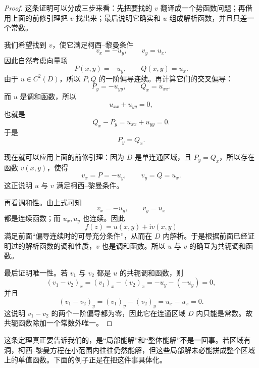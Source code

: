 \begin{proof}
这条证明可以分成三步来看：先把要找的 $v$ 翻译成一个势函数问题；再借用上面的前修引理把 $v$ 找出来；最后说明它确实和 $u$ 组成解析函数，并且只差一个常数。

我们希望找到 $v$，使它满足柯西--黎曼条件
\[
    v_x=-u_y,\qquad v_y=u_x.
\]
因此自然考虑向量场
\[
    P(x,y)=-u_y,\qquad Q(x,y)=u_x.
\]
由于 $u\in C^2(D)$，所以 $P,Q$ 的一阶偏导连续。再计算它们的交叉偏导：
\[
    P_y=-u_{yy},\qquad Q_x=u_{xx}.
\]
而 $u$ 是调和函数，所以
\[
    u_{xx}+u_{yy}=0,
\]
也就是
\[
    Q_x-P_y=u_{xx}+u_{yy}=0.
\]
于是
\[
    P_y=Q_x.
\]

现在就可以应用上面的前修引理：因为 $D$ 是单连通区域，且 $P_y=Q_x$，所以存在函数 $v(x,y)$，使得
\[
    v_x=P=-u_y,\qquad v_y=Q=u_x.
\]
这正说明 $u$ 与 $v$ 满足柯西--黎曼条件。

再看调和性。由上式可知
\[
    v_x=-u_y,\qquad v_y=u_x
\]
都是连续函数；而 $u_x,u_y$ 也连续。因此
\[
    f(z)=u(x,y)+\mathrm{i}v(x,y)
\]
满足前面``偏导连续时的可导充分条件''，从而在 $D$ 内解析。于是根据前面已经证明过的解析函数的调和性质，$v$ 也是调和函数。所以 $u$ 与 $v$ 的确互为共轭调和函数。

最后证明唯一性。若 $v_1$ 与 $v_2$ 都是 $u$ 的共轭调和函数，则
\[
    (v_1-v_2)_x=(v_1)_x-(v_2)_x=-u_y-(-u_y)=0,
\]
并且
\[
    (v_1-v_2)_y=(v_1)_y-(v_2)_y=u_x-u_x=0.
\]
这说明 $v_1-v_2$ 的两个一阶偏导都为零，因此它在连通区域 $D$ 内只能是常数。故共轭函数除加一个常数外唯一。
\end{proof}

\begin{tishi}[为什么单连通条件不能省略]
这条定理真正要告诉我们的，是``局部能解''和``整体能解''不是一回事。若区域有洞，柯西--黎曼方程在小范围内往往仍然能解，但这些局部解未必能拼成整个区域上的单值函数。下面的例子正是在把这件事具体化。
\end{tishi}


